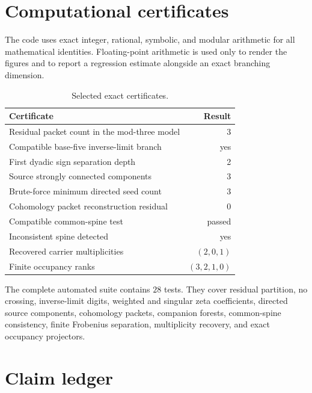 \documentclass[11pt]{article}
\theoremstyle{definition}
\theoremstyle{remark}
\begin{document}
\section{Computational certificates}

The code uses exact integer, rational, symbolic, and modular arithmetic for all mathematical identities.  Floating-point arithmetic is used only to render the figures and to report a regression estimate alongside an exact branching dimension.

\begin{table}[H]
\centering
\caption{Selected exact certificates.}
\begin{tabular}{lr}
\toprule
Certificate & Result\\
\midrule
Residual packet count in the mod-three model & 3\\
Compatible base-five inverse-limit branch & yes\\
First dyadic sign separation depth & 2\\
Source strongly connected components & 3\\
Brute-force minimum directed seed count & 3\\
Cohomology packet reconstruction residual & 0\\
Compatible common-spine test & passed\\
Inconsistent spine detected & yes\\
Recovered carrier multiplicities & \((2,0,1)\)\\
Finite occupancy ranks & \((3,2,1,0)\)\\
\bottomrule
\end{tabular}
\end{table}

The complete automated suite contains \(28\) tests.  They cover residual partition, no crossing, inverse-limit digits, weighted and singular zeta coefficients, directed source components, cohomology packets, companion forests, common-spine consistency, finite Frobenius separation, multiplicity recovery, and exact occupancy projectors.

\section{Claim ledger}
\end{document}
